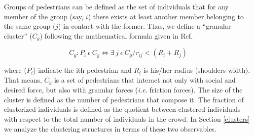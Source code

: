 Groups of pedestrians can be defined as the set of individuals that for any member of the group (say, $i$) there exists at least another member belonging to the same group ($j$) in contact with the former. Thus, we define a ``granular cluster'' ($C_g$) following the mathematical formula given in Ref.~\cite{Dorso1}

\begin{equation}
C_g:P_i~\epsilon~ C_g \Leftrightarrow \exists~ j~\epsilon~C_g / r_{ij} < (R_i+R_j) \label{ec-cluster}
\end{equation}


where ($P_i$) indicate the ith pedestrian and $R_i$ is his/her radius (shoulders width). That means, $C_g$ is a
set of pedestrians that interact not only with social and desired force, but also with granular forces (\textit{i.e.} friction forces).
The size of the cluster is defined as the number of pedestrians that compose it. The fraction of clusterized individuals is defined as the quotient between clustered individuals with respect to the total number of individuals in the crowd. In Section \ref{clusters} we analyze the clustering structures in terms of these two observables. 